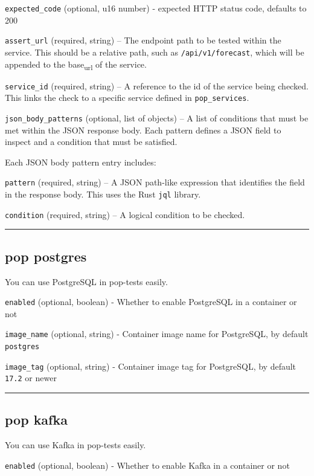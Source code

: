 \documentclass[11pt]{article}
\begin{document}
\texttt{expected\_code} (optional, u16 number) - expected HTTP status code, defaults to 200

\texttt{assert\_url} (required, string) – The endpoint path to be tested within the service. This should be a relative path, such as \texttt{/api/v1/forecast}, which will be appended to the base\textsubscript{url} of the service.

\texttt{service\_id} (required, string) – A reference to the id of the service being checked. This links the check to a specific service defined in \texttt{pop\_services}.

\texttt{json\_body\_patterns} (optional, list of objects) – A list of conditions that must be met within the JSON response body. Each pattern defines a JSON field to inspect and a condition that must be satisfied.

Each JSON body pattern entry includes:

\texttt{pattern} (required, string) – A JSON path-like expression that identifies the field in the response body. This uses the Rust \texttt{jql} library.

\texttt{condition} (required, string) – A logical condition to be checked.

\noindent\rule{\textwidth}{0.5pt}

\subsection{pop postgres}
\label{sec:org6c8afd4}

You can use PostgreSQL in pop-tests easily.

\texttt{enabled} (optional, boolean) - Whether to enable PostgreSQL in a container or not

\texttt{image\_name} (optional, string) - Container image name for PostgreSQL, by default \texttt{postgres}

\texttt{image\_tag} (optional, string) - Container image tag for PostgreSQL, by default \texttt{17.2} or newer

\noindent\rule{\textwidth}{0.5pt}

\subsection{pop kafka}
\label{sec:org2d8f86f}

You can use Kafka in pop-tests easily.

\texttt{enabled} (optional, boolean) - Whether to enable Kafka in a container or not
\end{document}

